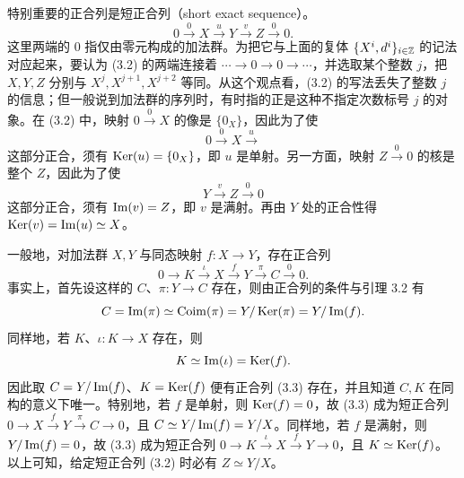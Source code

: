 特别重要的正合列是短正合列（short exact sequence）。
\begin{equation}
0 \xrightarrow{0} X \xrightarrow{u} Y \xrightarrow{v} Z \xrightarrow{0} 0. \tag{3.2}
\end{equation}
这里两端的 $0$ 指仅由零元构成的加法群。为把它与上面的复体 $\{X^i,d^i\}_{i\in\mathbb{Z}}$ 的记法对应起来，要认为 (3.2) 的两端连接着 $\cdots\to 0\to 0\to\cdots$，并选取某个整数 $j$，把 $X,Y,Z$ 分别与 $X^j,X^{j+1},X^{j+2}$ 等同。从这个观点看，(3.2) 的写法丢失了整数 $j$ 的信息；但一般说到加法群的序列时，有时指的正是这种不指定次数标号 $j$ 的对象。在 (3.2) 中，映射 $0\xrightarrow{0}X$ 的像是 $\{0_X\}$，因此为了使
\[
0 \xrightarrow{0} X \xrightarrow{u}
\]
这部分正合，须有 $\operatorname{Ker}(u)=\{0_X\}$，即 $u$ 是单射。另一方面，映射 $Z\xrightarrow{0}0$ 的核是整个 $Z$，因此为了使
\[
Y \xrightarrow{v} Z \xrightarrow{0} 0
\]
这部分正合，须有 $\operatorname{Im}(v)=Z$，即 $v$ 是满射。再由 $Y$ 处的正合性得 $\operatorname{Ker}(v)=\operatorname{Im}(u)\simeq X$。


一般地，对加法群 $X,Y$ 与同态映射 $f\colon X\to Y$，存在正合列
\begin{equation}
0 \to K \xrightarrow{\iota} X \xrightarrow{f} Y \xrightarrow{\pi} C \xrightarrow{0} 0. \tag{3.3}
\end{equation}
事实上，首先设这样的 $C$、$\pi\colon Y\to C$ 存在，则由正合列的条件与引理 3.2 有
\[
C=\operatorname{Im}(\pi)\simeq\operatorname{Coim}(\pi)=Y/\operatorname{Ker}(\pi)=Y/\operatorname{Im}(f).
\]
同样地，若 $K$、$\iota\colon K\to X$ 存在，则
\[
K\simeq\operatorname{Im}(\iota)=\operatorname{Ker}(f).
\]
因此取 $C=Y/\operatorname{Im}(f)$、$K=\operatorname{Ker}(f)$ 便有正合列 (3.3) 存在，并且知道 $C,K$ 在同构的意义下唯一。特别地，若 $f$ 是单射，则 $\operatorname{Ker}(f)=0$，故 (3.3) 成为短正合列 $0\to X\xrightarrow{f}Y\xrightarrow{\pi}C\to 0$，且 $C\simeq Y/\operatorname{Im}(f)=Y/X$。同样地，若 $f$ 是满射，则 $Y/\operatorname{Im}(f)=0$，故 (3.3) 成为短正合列 $0\to K\xrightarrow{\iota}X\xrightarrow{f}Y\to 0$，且 $K\simeq\operatorname{Ker}(f)$。以上可知，给定短正合列 (3.2) 时必有 $Z\simeq Y/X$。


